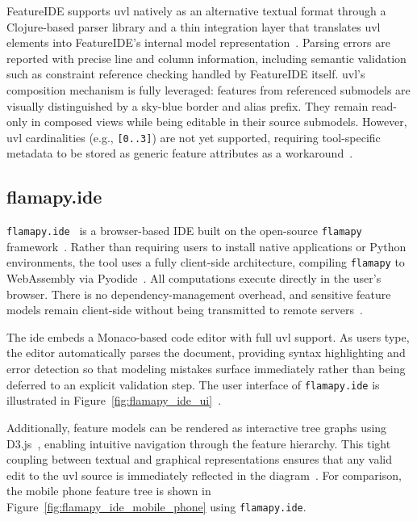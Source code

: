 FeatureIDE supports \gls{uvl} natively as an alternative textual format through a Clojure-based parser library and a thin integration layer that translates \gls{uvl} elements into FeatureIDE's internal model representation~\cite{sundermann_integration_2021}.
Parsing errors are reported with precise line and column information, including semantic validation such as constraint reference checking handled by FeatureIDE itself.
\gls{uvl}'s composition mechanism is fully leveraged: features from referenced submodels are visually distinguished by a sky-blue border and alias prefix.
They remain read-only in composed views while being editable in their source submodels.
However, \gls{uvl} cardinalities (e.g., \texttt{[0..3]}) are not yet supported, requiring tool-specific metadata to be stored as generic feature attributes as a workaround~\cite{sundermann_integration_2021}.

\subsection{flamapy.ide}
\label{subsec:flamapy_ide}

\texttt{flamapy.ide}~\cite{benitez_uvl_2025, noauthor_flamapyflamapy-ide_2026} is a browser-based IDE built on the open-source \texttt{flamapy} framework~\cite{galindo_flama_2023, noauthor_flamapyflamapy_2026}.
Rather than requiring users to install native applications or Python environments, the tool uses a fully client-side architecture, compiling \texttt{flamapy} to WebAssembly via Pyodide~\cite{noauthor_pyodidepyodide_2026}.
All computations execute directly in the user's browser.
There is no dependency-management overhead, and sensitive feature models remain client-side without being transmitted to remote servers~\cite{benitez_uvl_2025}.
 
The \gls{ide} embeds a Monaco-based code editor with full \gls{uvl} support.
As users type, the editor automatically parses the document, providing syntax highlighting and error detection so that modeling mistakes surface immediately rather than being deferred to an explicit validation step.
The user interface of \texttt{flamapy.ide} is illustrated in 
Figure~\ref{fig:flamapy_ide_ui}~\cite{benitez_uvl_2025}.

Additionally, feature models can be rendered as interactive tree graphs using D3.js~\cite{noauthor_d3d3_2026}, enabling intuitive navigation through the feature hierarchy.
This tight coupling between textual and graphical representations ensures that any valid edit to the \gls{uvl} source is immediately reflected in the diagram~\cite{benitez_uvl_2025}.
For comparison, the mobile phone feature tree is shown in Figure~\ref{fig:flamapy_ide_mobile_phone} using \texttt{flamapy.ide}.

